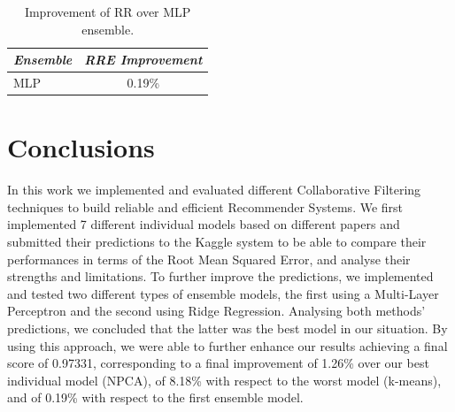 \documentclass[10pt,conference,compsocconf]{IEEEtran}
\begin{document}
\begin{table}[h!]
	\centering
	\begin{tabular}{l|c}
		\textit{\textbf{Ensemble}} & \textit{\textbf{RRE Improvement}} \\
		\hline
		MLP                     &      0.19\%                 \\                              
	\end{tabular}
\caption{Improvement of RR over MLP ensemble.}
\label{enssum}
\end{table}

\section{Conclusions}
\label{conc}

In this work we implemented and evaluated different Collaborative Filtering techniques to build reliable and efficient Recommender Systems. We first implemented 7 different individual models based on different papers and submitted their predictions to the Kaggle system to be able to compare their performances in terms of the Root Mean Squared Error, and analyse their strengths and limitations. To further improve the predictions, we implemented and tested two different types of ensemble models, the first using a Multi-Layer Perceptron and the second using Ridge Regression. Analysing both methods' predictions, we concluded that the latter was the best model in our situation. By using this approach, we were able to further enhance our results achieving a final score of 0.97331, corresponding to a final improvement of 1.26\% over our best individual model (NPCA), of 8.18\% with respect to the worst model (k-means), and of 0.19\% with respect to the first ensemble model.




\end{document}
